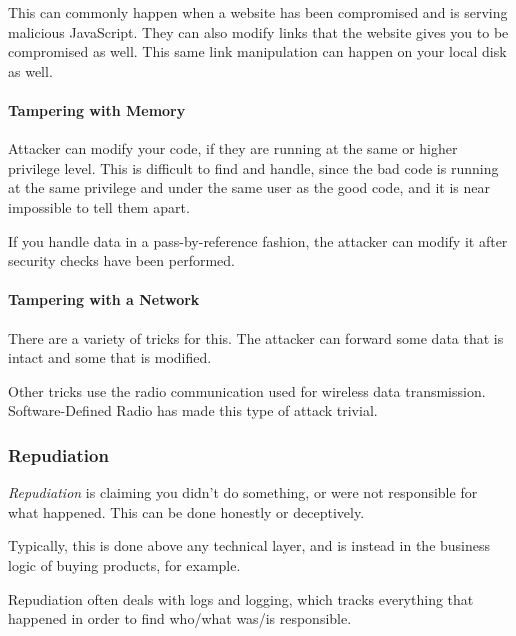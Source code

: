 This can commonly happen when a website has been compromised and is serving malicious JavaScript.
They can also modify links that the website gives you to be compromised as well.
This same link manipulation can happen on your local disk as well.

\paragraph{Tampering with Memory}\label{par:Tampering_Memory}
Attacker can modify your code, if they are running at the same or higher privilege level.
This is difficult to find and handle, since the bad code is running at the same privilege and under the same user as the good code, and it is near impossible to tell them apart.

If you handle data in a pass-by-reference fashion, the attacker can modify it after security checks have been performed.

\paragraph{Tampering with a Network}\label{par:Tampering_Network}
There are a variety of tricks for this.
The attacker can forward some data that is intact and some that is modified.

Other tricks use the radio communication used for wireless data transmission.
Software-Defined Radio has made this type of attack trivial.

\subsubsection{Repudiation}\label{subsubsec:Repudiation}
\begin{definition}[Repudiation]\label{def:Repudiation}
  \emph{Repudiation} is claiming you didn't do something, or were not responsible for what happened.
  This can be done honestly or deceptively.

  Typically, this is done above any technical layer, and is instead in the business logic of buying products, for example.

  Repudiation often deals with logs and logging, which tracks everything that happened in order to find who/what was/is responsible.
\end{definition}


